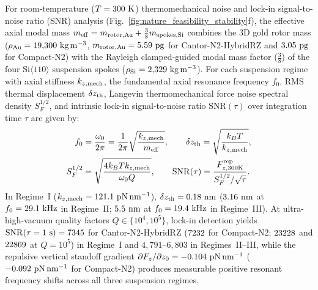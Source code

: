 \documentclass[pdflatex,sn-nature]{sn-jnl}
\DeclareRobustCommand{\roundzero}[1]{\fpeval{round(#1,0)}}
\DeclareRobustCommand{\roundone}[1]{\fpeval{round(#1,1)}}
\DeclareRobustCommand{\roundtwo}[1]{\fpeval{round(#1,2)}}
\DeclareRobustCommand{\roundthree}[1]{\fpeval{round(#1,3)}}
\begin{document}
For room-temperature ($T = 300{}\text{ K}$) thermomechanical noise and lock-in signal-to-noise ratio (SNR) analysis (Fig.~\ref{fig:nature_feasibility_stability}f), the effective axial modal mass $m_{\rm eff} = m_{\rm rotor,Au} + \frac{3}{8}m_{\rm spokes,Si}$ combines the 3D gold rotor mass ($\rho_{\rm Au} = 19{,}300\text{ kg}\,\text{m}^{-3}$, $m_{\rm rotor,Au} = \roundtwo{\NatureCantorNtwoHybridrzThermomechanicalNoiseMRotorGoldPg}\text{ pg}$ for Cantor-N2-HybridRZ and $\roundtwo{\NatureRotCeightCompactNtwoThermomechanicalNoiseMRotorGoldPg}\text{ pg}$ for Compact-N2) with the Rayleigh clamped-guided modal mass factor ($\frac{3}{8}$) of the four $\text{Si}\langle 110\rangle$ suspension spokes ($\rho_{\rm Si} = 2{,}329\text{ kg}\,\text{m}^{-3}$). For each suspension regime with axial stiffness $k_{z,\rm mech}$, the fundamental axial resonance frequency $f_0$, RMS thermal displacement $\delta z_{\rm th}$, Langevin thermomechanical force noise spectral density $S_F^{1/2}$, and intrinsic lock-in signal-to-noise ratio $\mathrm{SNR}(\tau)$ over integration time $\tau$ are given by:
\begin{equation}
\begin{aligned}
f_0 &= \frac{\omega_0}{2\pi} = \frac{1}{2\pi}\sqrt{\frac{k_{z,\rm mech}}{m_{\rm eff}}}, \qquad
\delta z_{\rm th} = \sqrt{\frac{k_B T}{k_{z,\rm mech}}}, \\
S_F^{1/2} &= \sqrt{\frac{4 k_B T k_{z,\rm mech}}{\omega_0 Q}}, \qquad
\mathrm{SNR}(\tau) = \frac{F_{z,300\rm K}^{\rm rep}}{S_F^{1/2} / \sqrt{\tau}}.
\end{aligned}
\label{eq:methods_thermomechanical_snr}
\end{equation}
In Regime~I ($k_{z,\rm mech} = \roundone{\NatureRotCeightCompactNtwoLateralStabilityKZMechPnPerNm}\text{ pN}\,\text{nm}^{-1}$), $\delta z_{\rm th} = \roundtwo{\NatureCantorNtwoHybridrzThermomechanicalNoiseThermalDzRegimeOneNm}\text{ nm}$ ($\roundtwo{\NatureCantorNtwoHybridrzThermomechanicalNoiseThermalDzRegimeTwoNm}\text{ nm}$ at $f_0 = \roundone{\NatureCantorNtwoHybridrzThermomechanicalNoiseResFreqRegimeTwoKhz}\text{ kHz}$ in Regime~II; $\roundtwo{\NatureCantorNtwoHybridrzThermomechanicalNoiseThermalDzRegimeThreeNm}\text{ nm}$ at $f_0 = \roundone{\NatureCantorNtwoHybridrzThermomechanicalNoiseResFreqRegimeThreeKhz}\text{ kHz}$ in Regime~III). At ultra-high-vacuum quality factors $Q \in \{10^4, 10^5\}$, lock-in detection yields $\mathrm{SNR}(\tau=1\text{ s}) = \roundzero{\NatureCantorNtwoHybridrzSnrOneSec}$ for Cantor-N2-HybridRZ ($\roundzero{\NatureRotCeightCompactNtwoSnrOneSec}$ for Compact-N2; $\roundzero{\NatureCantorNtwoHybridrzSnrOneSecQoneefive}$ and $\roundzero{\NatureRotCeightCompactNtwoSnrOneSecQoneefive}$ at $Q=10^5$) in Regime~I and $4{,}791\text{--}6{,}803$ in Regimes~II--III, while the repulsive vertical standoff gradient $\partial F_z/\partial z_0 = \roundthree{\NatureCantorNtwoHybridrzThermomechanicalNoiseDfzDzzeroPnPerNm}\text{ pN}\,\text{nm}^{-1}$ ($\roundthree{\NatureRotCeightCompactNtwoThermomechanicalNoiseDfzDzzeroPnPerNm}\text{ pN}\,\text{nm}^{-1}$ for Compact-N2) produces measurable positive resonant frequency shifts across all three suspension regimes.
\end{document}
